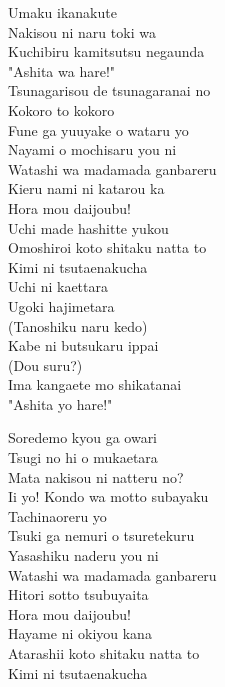 \def\songtitle{Sora mo Kokoro mo Hareru kara}
\def\songcomment{}
\def\songlyrics{Aki Hata}
\def\songwriter{Atsushi Harada}
\def\songarrange{Masatomi Waki}
   
\ifdefined\COMPLETE
\else
	
	
\fi
\thispagestyle{song}

\begin{multicols}{2}
Umaku ikanakute\\
Nakisou ni naru toki wa\\
Kuchibiru kamitsutsu negaunda\\
"Ashita wa hare!"\\

Tsunagarisou de tsunagaranai no\\
Kokoro to kokoro\\

Fune ga yuuyake o wataru yo\\
Nayami o mochisaru you ni\\
Watashi wa madamada ganbareru\\
Kieru nami ni katarou ka\\
Hora mou daijoubu!\\
Uchi made hashitte yukou\\
Omoshiroi koto shitaku natta to\\
Kimi ni tsutaenakucha\\
Uchi ni kaettara\\

Ugoki hajimetara\\
(Tanoshiku naru kedo)\\
Kabe ni butsukaru ippai\\
(Dou suru?)\\
Ima kangaete mo shikatanai\\
"Ashita yo hare!"\columnbreak

Soredemo kyou ga owari\\
Tsugi no hi o mukaetara\\
Mata nakisou ni natteru no?\\
Ii yo! Kondo wa motto subayaku\\
Tachinaoreru yo\\

Tsuki ga nemuri o tsuretekuru\\
Yasashiku naderu you ni\\
Watashi wa madamada ganbareru\\
Hitori sotto tsubuyaita\\
Hora mou daijoubu!\\
Hayame ni okiyou kana\\
Atarashii koto shitaku natta to\\
Kimi ni tsutaenakucha\\


\end{multicols}
